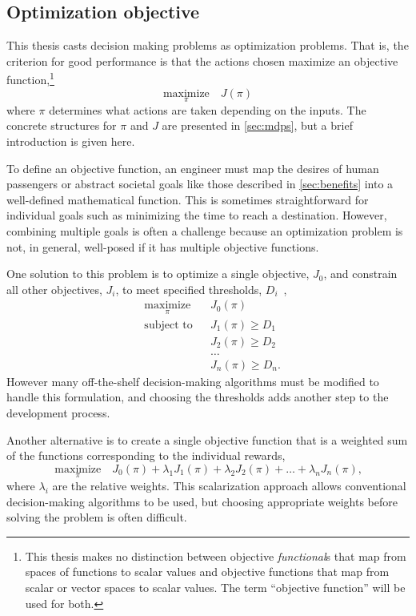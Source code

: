 \subsection{Optimization objective}

This thesis casts decision making problems as optimization problems.
That is, the criterion for good performance is that the actions chosen maximize an objective function,\footnote{This thesis makes no distinction between objective \emph{functional}s that map from spaces of functions to scalar values and objective functions that map from scalar or vector spaces to scalar values. The term ``objective function'' will be used for both.}
\begin{equation}
\underset{\pi}{\text{maximize}} \quad J(\pi)
\end{equation}
where $\pi$ determines what actions are taken depending on the inputs. The concrete structures for $\pi$ and $J$ are presented in \cref{sec:mdps}, but a brief introduction is given here.

To define an objective function, an engineer must map the desires of human passengers or abstract societal goals like those described in \cref{sec:benefits} into a well-defined mathematical function.
This is sometimes straightforward for individual goals such as minimizing the time to reach a destination.
However, combining multiple goals is often a challenge because an optimization problem is not, in general, well-posed if it has multiple objective functions.

One solution to this problem is to optimize a single objective, $J_0$, and constrain all other objectives, $J_i$, to meet specified thresholds, $D_i$~\cite{EA:99},
\begin{equation}
    \begin{aligned}
    & \underset{\pi}{\text{maximize}} & & J_0(\pi) \\
    & \text{subject to} & & J_1(\pi) \geq D_1 \\
    &                   & & J_2(\pi) \geq D_2 \\
    &                   & & \ldots \\
    &                   & & J_n(\pi) \geq D_n \text{.}
    \end{aligned}
\end{equation}
However many off-the-shelf decision-making algorithms must be modified to handle this formulation, and choosing the thresholds adds another step to the development process.

Another alternative is to create a single objective function that is a weighted sum of the functions corresponding to the individual rewards,
\begin{equation}
    \underset{\pi}{\text{maximize}} \quad J_0(\pi) + \lambda_1 J_1(\pi) + \lambda_2 J_2(\pi) + \ldots + \lambda_n J_n(\pi) \text{,}
\end{equation}
where $\lambda_i$ are the relative weights.
This scalarization approach allows conventional decision-making algorithms to be used, but choosing appropriate weights before solving the problem is often difficult.

